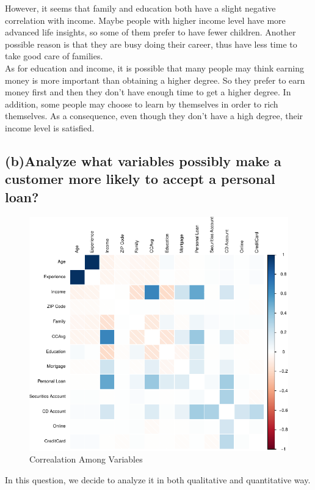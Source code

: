 \documentclass[]{article}
\begin{document}
  However, it seems that family and education both have a slight negative correlation with income. Maybe people with higher income level have more advanced life insights, so some of them prefer to have fewer children. Another possible reason is that they are busy doing their career, thus have less time to take good care of families. \\
  As for education and income, it is possible that many people may think earning money is more important than obtaining a higher degree. So they prefer to earn money first and then they don’t have enough time to get a higher degree. In addition, some people may choose to learn by themselves in order to rich themselves. As a consequence, even though they don’t have a high degree, their income level is satisfied.


\subsection{(b)Analyze what variables possibly make a customer more likely to accept a personal loan?}

\begin{figure} 
  \includegraphics{tem_files/figure-latex/exa-1.pdf}
  \caption{Correalation Among Variables}
\end{figure}
In this question, we decide to analyze it in both qualitative and quantitative way. 
\end{document}
